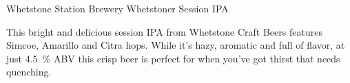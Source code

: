 \begin{recipie}{Whetstone Station Brewery Whetstoner Session IPA}

\begin{aboutblock}
This bright and delicious session IPA from Whetstone Craft Beers features Simcoe,
Amarillo and Citra hops. While it's hazy, aromatic and full of flavor, at just
4.5~\% ABV this crisp beer is perfect for when you've got thirst that needs quenching.
\end{aboutblock}


\begin{methodandtiming}
 
\begin{mashsteps}
\end{mashsteps}

\begin{fermentationsteps}
\end{fermentationsteps}

\end{methodandtiming}

\pagebreak

\begin{ingredientsblock}

\begin{malts}
\end{malts}

\begin{hops}
\end{hops}

\begin{yeasts}
\end{yeasts}

\end{ingredientsblock}

\end{recipie}

